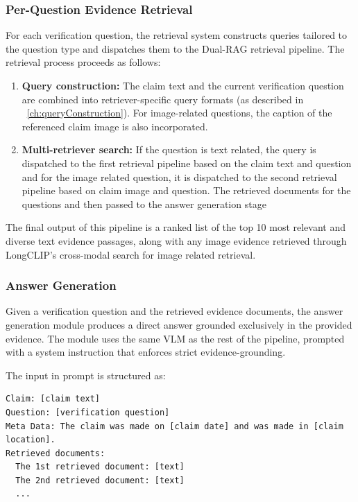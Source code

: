 \subsubsection{Per-Question Evidence Retrieval}

For each verification question, the retrieval system constructs queries tailored to the question type and dispatches them to the Dual-RAG retrieval pipeline. The retrieval process proceeds as follows:

\begin{enumerate}
    \item \textbf{Query construction:} The claim text and the current verification question are combined into retriever-specific query formats (as described in ~\ref{ch:queryConstruction}). For image-related questions, the caption of the referenced claim image is also incorporated.
    \item \textbf{Multi-retriever search:} If the question is text related, the query is dispatched to the first retrieval pipeline based on the claim text and question and for the image related question, it is dispatched to the second retrieval pipeline based on claim image and question. The retrieved documents for the questions and then passed to the answer generation stage
\end{enumerate}

The final output of this pipeline is a ranked list of the top 10 most relevant and diverse text evidence passages, along with any image evidence retrieved through LongCLIP's cross-modal search for image related retrieval.

\subsubsection{Answer Generation}

Given a verification question and the retrieved evidence documents, the answer generation module produces a direct answer grounded exclusively in the provided evidence. The module uses the same VLM as the rest of the pipeline, prompted with a system instruction that enforces strict evidence-grounding.

The input in prompt is structured as:

\begin{verbatim}
Claim: [claim text]
Question: [verification question]
Meta Data: The claim was made on [claim date] and was made in [claim location].
Retrieved documents:
  The 1st retrieved document: [text]
  The 2nd retrieved document: [text]
  ...
\end{verbatim}

